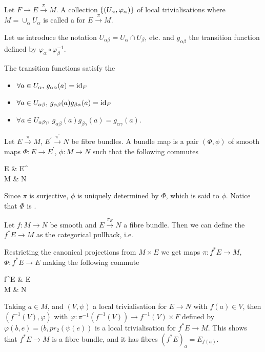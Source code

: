 \documentclass{article}
\begin{document}
\begin{definition}
Let $F \to E \overset{\pi}{\to} M$. A collection $\left\{ (U_\alpha,\varphi_\alpha) \right\}$ of local trivialisations where $M = \cup_{\alpha} U_\alpha$ is called a  for $E \overset{\pi}{\to} M$. 
\end{definition}

Let us introduce the notation $U_{\alpha\beta} = U_\alpha \cap U_\beta$, etc. and $g_{\alpha\beta}$ the transition function defined by $\varphi_\alpha \circ \varphi_\beta^{-1}$. 

\begin{fact}
The transition functions satisfy the 
\begin{itemize}
    \item $\forall a \in U_\alpha, \, g_{\alpha\alpha}(a) = \operatorname{id}_F$
    \item $\forall a \in U_{\alpha\beta}, \, g_{\alpha\beta}(a)g_{\beta\alpha}(a) = \operatorname{id}_F$
    \item $\forall a \in U_{\alpha\beta\gamma}, \, g_{\alpha\beta}(a)g_{\beta\gamma}(a)=g_{\alpha\gamma}(a)$.
\end{itemize}
\end{fact}

\begin{definition}
Let $E \overset{\pi}{\to} M$, $E^\prime \overset{\pi^\prime}{\to} N$ be fibre bundles. A bundle map is a pair $(\Phi,\phi)$ of smooth maps $\Phi:E \to E^\prime$, $\phi:M \to N$ such that the following commutes
\begin{tkz}
E \arrow[r,"\Phi"] \arrow[d,"\pi"'] & E^\prime \arrow[d,"\pi^\prime"] \\ M \arrow[r,"\phi"] & N
\end{tkz}
Since $\pi$ is surjective, $\phi$ is uniquely determined by $\Phi$, which is said to  $\phi$. Notice that $\Phi$ is . 
\end{definition}

\begin{definition}
Let $f:M \to  N$ be smooth and $E \overset{\pi_E}{\to} N$ a fibre bundle. Then we can define the  $f^\ast E \to M$ as the categorical pullback, i.e. 
\end{definition}
Restricting the canonical projections from $M \times E$ we get maps $\pi : f^\ast E \to M$, $\Phi:f^\ast E \to E$ making the following commute 
\begin{tkz}
f^\ast E \arrow[r,"\Phi"] \arrow[d,"\pi"'] & E \arrow[d,"\pi_E"] \\ M \arrow[r,"f"] & N
\end{tkz}
Taking $ a \in M$, and $(V, \psi)$ a local trivialisation for $E \to N$ with $f(a) \in V$, then $(f^{-1}(V),\varphi)$ with $\varphi: \pi^{-1}(f^{-1}(V)) \to f^{-1}(V) \times F$ defined by $\varphi(b,e) = (b,pr_2(\psi(e))$ is a local trivialisation for $f^\ast E \to M$. This shows that $f^\ast E \to M$ is a fibre bundle, and it has fibres $(f^\ast E)_a = E_{f(a)}$. 
\end{document}
